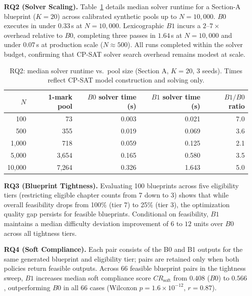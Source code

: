\documentclass[runningheads]{llncs}
\begin{document}
\noindent\textbf{RQ2 (Solver Scaling).} Table~\ref{tab:rq2} details median solver runtime for a Section-A blueprint ($K{=}20$) across calibrated synthetic pools up to $N=10{,}000$. $B0$ executes in under $0.33$\,s at $N=10{,}000$. Lexicographic $B1$ incurs a $2$--$7\times$ overhead relative to $B0$, completing three passes in $1.64$\,s at $N=10{,}000$ and under $0.07$\,s at production scale ($N\approx500$). All runs completed within the solver budget, confirming that CP-SAT solver search overhead remains modest at scale.

\begin{table}[t]
\caption{RQ2: median solver runtime vs.\ pool size (Section A, $K{=}20$, 3 seeds). Times reflect CP-SAT model construction and solving only.}
\label{tab:rq2}
\centering
\small
\begin{tabular}{rrrrr}
\toprule
$N$ & 1-mark pool & $B0$ solver time (s) & $B1$ solver time (s) & $B1/B0$ ratio \\
\midrule
100 & 73 & 0.003 & 0.021 & 7.0 \\
500 & 355 & 0.019 & 0.069 & 3.6 \\
1,000 & 718 & 0.059 & 0.125 & 2.1 \\
5,000 & 3,654 & 0.165 & 0.580 & 3.5 \\
10,000 & 7,264 & 0.326 & 1.643 & 5.0 \\
\bottomrule
\end{tabular}
\end{table}

\noindent\textbf{RQ3 (Blueprint Tightness).} Evaluating 100 blueprints across five eligibility tiers (restricting eligible chapter counts from 7 down to 3) shows that while overall feasibility drops from 100\% (tier 7) to 25\% (tier 3), the optimization quality gap persists for feasible blueprints. Conditional on feasibility, $B1$ maintains a median difficulty deviation improvement of $6$ to $12$ units over $B0$ across all tightness tiers.

\noindent\textbf{RQ4 (Soft Compliance).} Each pair consists of the B0 and B1 outputs for the same generated blueprint and eligibility tier; pairs are retained only when both policies return feasible outputs. Across 66 feasible blueprint pairs in the tightness sweep, $B1$ increases median soft compliance score $CR_{\mathrm{soft}}$ from $0.408$ ($B0$) to $0.566$, outperforming $B0$ in all 66 cases (Wilcoxon $p=1.6{\times}10^{-12}$, $r=0.87$).
\end{document}
